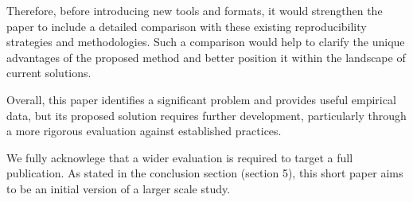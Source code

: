 \documentclass[%
	11pt,
	final,
]{article}
\begin{document}
Therefore, before introducing new tools and formats, it would strengthen the paper to include a detailed comparison with these existing reproducibility strategies and methodologies.
Such a comparison would help to clarify the unique advantages of the proposed method and better position it within the landscape of current solutions.

Overall, this paper identifies a significant problem and provides useful empirical data, but its proposed solution requires further development, particularly through a more rigorous evaluation against established practices.

\begin{review-answer}
  We fully acknowlege that a wider evaluation is required to target a full publication.
  As stated in the conclusion section (section 5), this short paper aims to be an initial version of a larger scale study.
\end{review-answer}
\end{document}
